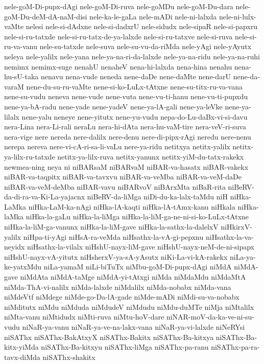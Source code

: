 {nele-goM-Di-pupx-dAgi
nele-goM-Di-ruva
nele-goMDu
nele-goM-Du-dara
nele-goM-Du-deM-dA-naM-disi
nele-ka-le-gaLa
nele-mADi
nele-ni-lalxda
nele-ni-lulx-vaMte
nelesi
nele-si-dAdxne
nele-si-dadxrU
nele-sidudx
nele-sipaR
nele-si-papxru
nele-si-ru-tatxde
nele-si-ru-tatx-de-ya-lalxde
nele-si-ru-tatxve
nele-si-ruva
nele-si-ru-va-vanu
nele-su-tatxde
nele-suva
nele-su-vu-da-riMda
nele-yAgi
nele-yAyutx
neleya
nele-yalilx
nele-yana
nele-ya-na-ri-da-lalxde
nele-ya-na-ridu
nele-ya-na-ruhi
nemimx
nemimx-suge
nenahU
nenaheV
nena-hi-lalxda
nena-hina
nenahu
nena-hu-sU-taka
nenavu
nena-vude
neneda
nene-daDe
nene-daMte
nene-darU
nene-da-varaM
nene-du-su-ru-vaMte
nene-si-ko-LuLx-tAtxne
nene-su-titx-ru-va-vana
nene-su-vudu
neneva
nene-vude
nene-vuta
nene-vu-ti-hanu
nene-vu-ti-pupxdu
nene-ya-bA-radu
nene-yade
nene-yadeV
nene-ya-lA-gali
nene-ya-leVke
nene-ya-lilalx
nene-yalu
neneye
nene-yitutx
nene-yu-vudu
nepa-do-Lu-daBx-vi-si-davu
nera-Lina
nera-Li-rali
neraLu
nera-hi-dAta
nera-hu-vaM-tire
nera-veV-ri-suva
nera-vige
nere
nereda
nere-dalilx
nere-denu
nere-di-pipx-rAgi
neredu
nere-nenu
nerepa
nereva
nere-vi-cA-ri-sa-li-vaLu
nere-ya-ridu
netitxya
netitx-yalilx
netitx-ya-lilx-ru-tatxde
netitx-ya-lilx-ruva
netitx-yanunx
netitx-yiM-du-tatx-rakekx
newmea-ning
neya
ni
niBARsaM
niBARvaM
niBAR-va-hasatx
niBAR-vakekx
niBAR-va-taqpitx
niBAR-va-tavxvu
niBAR-va-veMba
niBAR-va-veM-daDe
niBAR-va-veM-deMba
niBAR-vavu
niBARvoV
niBArxMta
niBaR-rita
niBeRV-da-di-ra-va-Ki-La-yajacnx
niBeRV-da-liMga
niDi-du-ka-lalx-taMdu
niH
niHka-LaMka
niHka-LaM-ka-nAgi
niHka-lA-kaqti
niHka-lA-tAmx-kanu
niHkala
niHka-laMka
niHka-la-gaLu
niHka-la-liMga
niHka-la-liM-ga-ne-ni-si-ko-LuLx-tAtxne
niHka-la-liM-ga-vanunx
niHka-la-liM-gave
niHka-la-sathx-la-dalelxV
niHkirxV-yalilx
niHpa-ti-yAgi
niHsA-ra-veMda
niHsathx-la-vA-gi-pepxnu
niHsathx-la-va-neyidx
niHsathx-la-vilalx
niHshU-nayx-liM-gave
niHshU-nayx-neM-de-ni-sipapx
niHshU-nayx-vA-yitutx
niHsherxV-ya-sA-yAsutx
niKi-La-vi-kA-rakekx
niLa-ya-ke-yatxMdu
niLa-yamaM
niLi-biTuTx
niMbu-goM-Di-pupx-dAgi
niMdA
niMdA-gave
niMdAta
niMdA-taMge
niMdA-yi-tAtxgi
niMda
niMdaMdu
niMdaMtA
niMda-ThA-vi-nalilx
niMda-lalxde
niMdalilx
niMda-nobabx
niMda-vana
niMdeVtf
niMdege
niMde-go-Da-lA-gade
niMde-mADi
niMdi-su-va-nobabx
niMditutx
niMdu
niMduda
niMdudeV
niMdudu
niMdu-duMTe
niMja
niMtalilx
niMta-vanu
niMtidudx
niMti-ruva
niMtu-hoV-dare
niNAR-moV-da-ka-ve-ni-su-vudu
niNaR-ya-vanu
niNaR-ya-ve-na-lakx-vana
niNaR-ya-vi-lalxde
niNeRYsi
niSAThx
niSAThx-BakAtxyX
niSAThx-Bakitx
niSAThx-Ba-kitxya
niSAThx-Ba-kitx-yiMda
niSAThx-Ba-kitxyu
niSAThx-liMga
niSAThx-pa-ranu
niSAThx-pa-ra-tavx-diMda
niSAThx-shakitx
}
